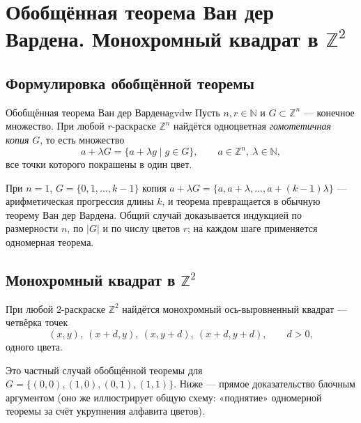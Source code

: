 
\section{Обобщённая теорема Ван дер Вардена. Монохромный квадрат в $\mathbb Z^2$}


\subsection{Формулировка обобщённой теоремы}

\begin{Theorem}{Обобщённая теорема Ван дер Вардена}{gvdw}
	Пусть $n,r\in\mathbb N$ и $G\subset\mathbb Z^n$ — конечное множество. При любой $r$-раскраске $\mathbb Z^n$ найдётся одноцветная \emph{гомотетичная копия} $G$, то есть множество
	\[
	a+\lambda G=\{a+\lambda g\mid g\in G\},\qquad a\in\mathbb Z^n,\ \lambda\in\mathbb N,
	\]
	все точки которого покрашены в один цвет.
\end{Theorem}

\begin{Remark}{}{}
	При $n=1$, $G=\{0,1,\ldots,k-1\}$ копия $a+\lambda G=\{a,a+\lambda,\ldots,a+(k-1)\lambda\}$ — арифметическая прогрессия длины $k$, и теорема превращается в обычную теорему Ван дер Вардена. Общий случай доказывается индукцией по размерности $n$, по $|G|$ и по числу цветов $r$; на каждом шаге применяется одномерная теорема.
\end{Remark}

\subsection{Монохромный квадрат в $\mathbb Z^2$}

\begin{Statement}{}{}
	При любой $2$-раскраске $\mathbb Z^2$ найдётся монохромный ось-выровненный квадрат — четвёрка точек
	\[
	(x,y),\ (x{+}d,y),\ (x,y{+}d),\ (x{+}d,y{+}d),\qquad d>0,
	\]
	одного цвета.
\end{Statement}

Это частный случай обобщённой теоремы для $G=\{(0,0),(1,0),(0,1),(1,1)\}$. Ниже — прямое доказательство блочным аргументом (оно же иллюстрирует общую схему: «поднятие» одномерной теоремы за счёт укрупнения алфавита цветов).

